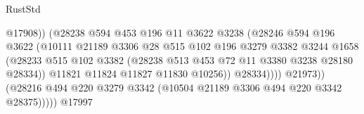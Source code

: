 \begin{lexlean}{RustStd}
\begin{coremodule}
                                              @17908))
                                          (@28238
                                            @594
                                            @453
                                            @196
                                            @11
                                            @3622
                                            @3238
                                            (@28246
                                              @594
                                              @196
                                              @3622
                                              (@10111
                                                @21189
                                                @3306
                                                @28
                                                @515
                                                @102
                                                @196
                                                @3279
                                                @3382
                                                @3244
                                                @1658
                                                (@28233
                                                  @515
                                                  @102
                                                  @3382
                                                  (@28238
                                                    @513
                                                    @453
                                                    @72
                                                    @11
                                                    @3380
                                                    @3238
                                                    @28180
                                                    @28334))
                                                @11821
                                                @11824
                                                @11827
                                                @11830
                                                @10256))
                                            @28334))))
                                    @21973))
                                (@28216
                                  @494
                                  @220
                                  @3279
                                  @3342
                                  (@10504 @21189 @3306 @494 @220 @3342 @28375)))))
                          @17997

\end{coremodule}
\end{lexlean}

